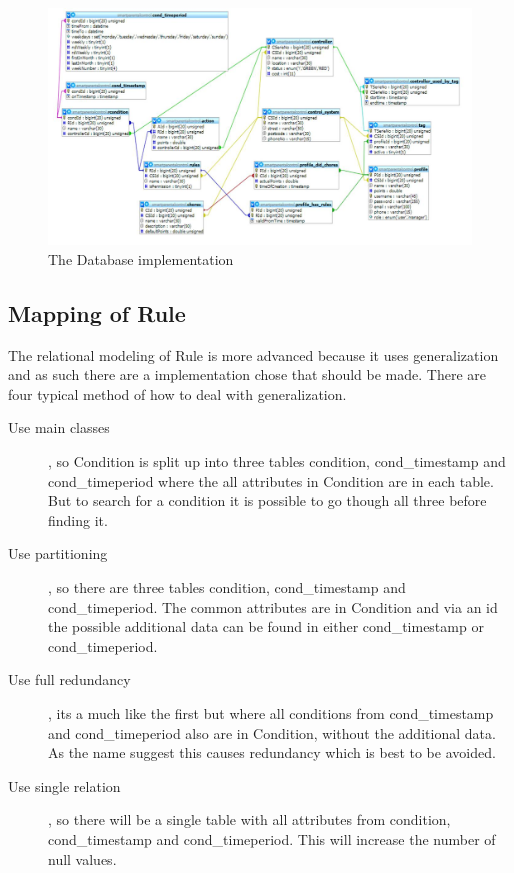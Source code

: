 \begin{figure}
	\centering
		\includegraphics[width=1.00\textwidth]{images/databaseDiagram.jpg}
	\caption{The Database implementation}
	\label{fig:databaseDiagram}
\end{figure}

\subsection{Mapping of Rule}
The relational modeling of Rule is more advanced because it uses generalization and as such there are a implementation chose that should be made. There are four typical method of how to deal with generalization.

\begin{description}
	\item[Use main classes], so Condition is split up into three tables condition, cond\_timestamp and cond\_timeperiod where the all attributes in Condition are in each table. But to search for a condition it is possible to go though all three before finding it. 
	\item[Use partitioning], so there are three tables condition, cond\_timestamp and cond\_timeperiod. The common attributes are in Condition and via an id the possible additional data can be found in either cond\_timestamp or cond\_timeperiod.
	\item[Use full redundancy], its a much like the first but where all conditions from cond\_timestamp and cond\_timeperiod also are in Condition, without the additional data. As the name suggest this causes redundancy which is best to be avoided.
	\item[Use single relation], so there will be a single table with all attributes from condition, cond\_timestamp and cond\_timeperiod. This will increase the number of null values. 
\end{description}

